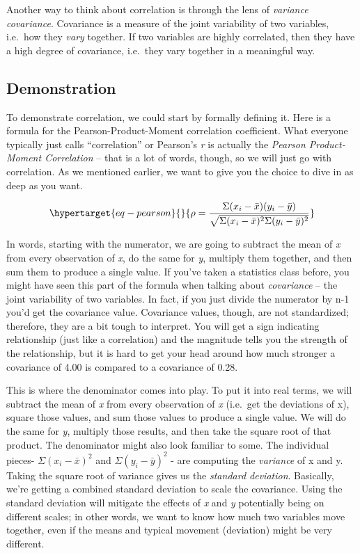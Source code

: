\documentclass[
  letterpaper,
]{krantz}
\begin{document}
Another way to think about correlation is through the lens of
\emph{variance} \emph{covariance}. Covariance is a measure of the joint
variability of two variables, i.e.~how they \emph{vary} together. If two
variables are highly correlated, then they have a high degree of
covariance, i.e.~they vary together in a meaningful way.

\subsection{Demonstration}\label{demonstration}

To demonstrate correlation, we could start by formally defining it. Here
is a formula for the Pearson-Product-Moment correlation coefficient.
What everyone typically just calls ``correlation'' or Pearson's \emph{r}
is actually the \emph{Pearson Product-Moment Correlation} -- that is a
lot of words, though, so we will just go with correlation. As we
mentioned earlier, we want to give you the choice to dive in as deep as
you want.

\begin{equation}\protect\hypertarget{eq-pearson}{}{
\rho = \frac{\Sigma(x_i-\bar{x})(y_i-\bar{y})}{\sqrt{\Sigma(x_i-\bar{x})^2\Sigma(y_i-\bar{y})^2}}
}\label{eq-pearson}\end{equation}

In words, starting with the numerator, we are going to subtract the mean
of \emph{x} from every observation of \emph{x}, do the same for
\emph{y}, multiply them together, and then sum them to produce a single
value. If you've taken a statistics class before, you might have seen
this part of the formula when talking about \emph{covariance} -- the
joint variability of two variables. In fact, if you just divide the
numerator by n-1 you'd get the covariance value. Covariance values,
though, are not standardized; therefore, they are a bit tough to
interpret. You will get a sign indicating relationship (just like a
correlation) and the magnitude tells you the strength of the
relationship, but it is hard to get your head around how much stronger a
covariance of 4.00 is compared to a covariance of 0.28.

This is where the denominator comes into play. To put it into real
terms, we will subtract the mean of \emph{x} from every observation of
\emph{x} (i.e.~get the deviations of x), square those values, and sum
those values to produce a single value. We will do the same for
\emph{y}, multiply those results, and then take the square root of that
product. The denominator might also look familiar to some. The
individual pieces- \(\Sigma(x_i-\bar{x})^2\) and
\(\Sigma(y_i-\bar{y})^2\) - are computing the \emph{variance} of x and
y. Taking the square root of variance gives us the \emph{standard
deviation}. Basically, we're getting a combined standard deviation to
scale the covariance. Using the standard deviation will mitigate the
effects of \emph{x} and \emph{y} potentially being on different scales;
in other words, we want to know how much two variables move together,
even if the means and typical movement (deviation) might be very
different.
\end{document}
